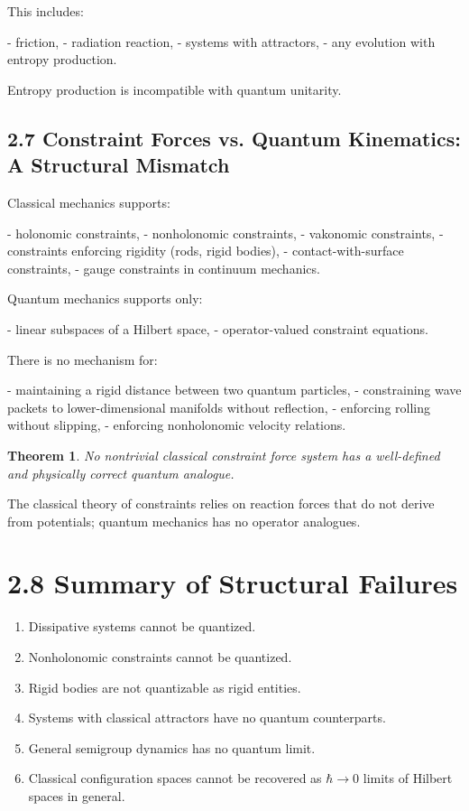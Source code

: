 \documentclass[12pt,oneside]{book}
\theoremstyle{plain}
\newtheorem{theorem}{Theorem}[chapter]
\theoremstyle{definition}
\begin{document}
This includes:

- friction,
- radiation reaction,
- systems with attractors,
- any evolution with entropy production.

Entropy production is incompatible with quantum unitarity.

\subsection{2.7 Constraint Forces vs. Quantum Kinematics: A Structural Mismatch}

Classical mechanics supports:

- holonomic constraints,
- nonholonomic constraints,
- vakonomic constraints,
- constraints enforcing rigidity (rods, rigid bodies),
- contact-with-surface constraints,
- gauge constraints in continuum mechanics.

Quantum mechanics supports only:

- linear subspaces of a Hilbert space,
- operator-valued constraint equations.

There is no mechanism for:

- maintaining a rigid distance between two quantum particles,
- constraining wave packets to lower-dimensional manifolds without reflection,
- enforcing rolling without slipping,
- enforcing nonholonomic velocity relations.

\begin{theorem}
No nontrivial classical constraint force system has a well-defined and physically correct quantum analogue.
\end{theorem}

The classical theory of constraints relies on reaction forces that do not derive from potentials; quantum mechanics has no operator analogues.

\section{2.8 Summary of Structural Failures}

\begin{enumerate}
\item Dissipative systems cannot be quantized.  
\item Nonholonomic constraints cannot be quantized.  
\item Rigid bodies are not quantizable as rigid entities.  
\item Systems with classical attractors have no quantum counterparts.  
\item General semigroup dynamics has no quantum limit.  
\item Classical configuration spaces cannot be recovered as $\hbar\to0$ limits of Hilbert spaces in general.
\end{enumerate}
\end{document}
